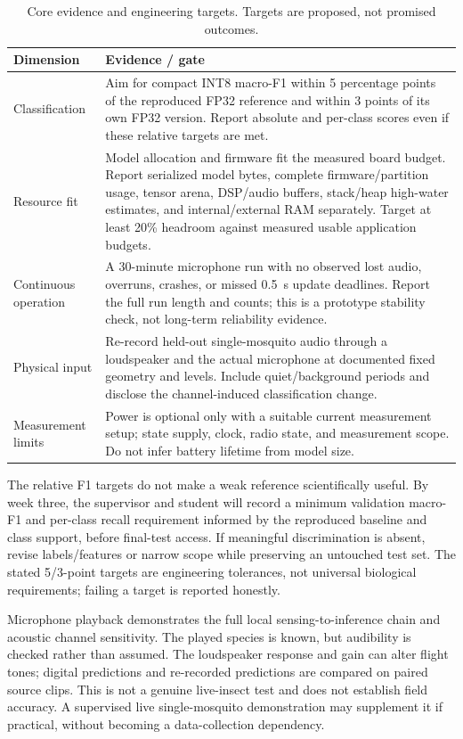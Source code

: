 \documentclass[a4paper,11pt]{article}
\begin{document}
\begin{table}[htbp]
\centering\small
\caption{Core evidence and engineering targets. Targets are proposed, not promised outcomes.}
\label{tab:gate}
\begin{tabularx}{\linewidth}{P{3.0cm}Y}
\toprule\textbf{Dimension} & \textbf{Evidence / gate}\\\midrule
Classification & Aim for compact INT8 macro-F1 within 5 percentage points of the reproduced FP32 reference and within 3 points of its own FP32 version. Report absolute and per-class scores even if these relative targets are met.\\
Resource fit & Model allocation and firmware fit the measured board budget. Report serialized model bytes, complete firmware/partition usage, tensor arena, DSP/audio buffers, stack/heap high-water estimates, and internal/external RAM separately. Target at least 20\% headroom against measured usable application budgets.\\
Continuous operation & A 30-minute microphone run with no observed lost audio, overruns, crashes, or missed 0.5~s update deadlines. Report the full run length and counts; this is a prototype stability check, not long-term reliability evidence.\\
Physical input & Re-record held-out single-mosquito audio through a loudspeaker and the actual microphone at documented fixed geometry and levels. Include quiet/background periods and disclose the channel-induced classification change.\\
Measurement limits & Power is optional only with a suitable current measurement setup; state supply, clock, radio state, and measurement scope. Do not infer battery lifetime from model size.\\
\bottomrule
\end{tabularx}
\end{table}

The relative F1 targets do not make a weak reference scientifically useful. By week three, the supervisor and student will record a minimum validation macro-F1 and per-class recall requirement informed by the reproduced baseline and class support, before final-test access. If meaningful discrimination is absent, revise labels/features or narrow scope while preserving an untouched test set. The stated 5/3-point targets are engineering tolerances, not universal biological requirements; failing a target is reported honestly.

Microphone playback demonstrates the full local sensing-to-inference chain and acoustic channel sensitivity. The played species is known, but audibility is checked rather than assumed. The loudspeaker response and gain can alter flight tones; digital predictions and re-recorded predictions are compared on paired source clips. This is not a genuine live-insect test and does not establish field accuracy. A supervised live single-mosquito demonstration may supplement it if practical, without becoming a data-collection dependency.
\end{document}
